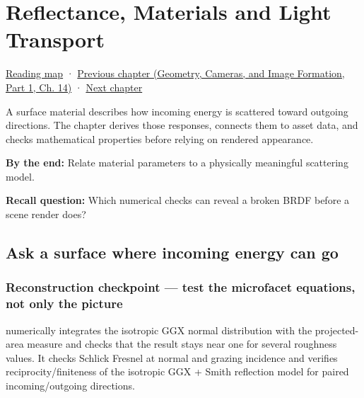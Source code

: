 \chapter{Reflectance, Materials and Light Transport}\label{03-visual-computing-i-ch005-reflectance-materials-and-light-transport}\hypertarget{03-visual-computing-i-ch005}{}\label{stagechapter:03-visual-computing-i-ch005}

\hypertarget{03-visual-computing-i-ch005-reflectance-materials-and-light-transport}{}

\hyperref[volume-reading-map]{Reading map} · \href{../03-Geometry-Cameras-and-Image-Formation-P01/main.pdf\#04-visual-computing-ii-ch033}{Previous chapter (Geometry, Cameras, and Image Formation, Part 1, Ch. 14)} · \hyperref[03-visual-computing-i-ch007]{Next chapter}

A surface material describes how incoming energy is scattered toward outgoing directions. The chapter derives those responses, connects them to asset data, and checks mathematical properties before relying on rendered appearance.

\textbf{By the end:} Relate material parameters to a physically meaningful scattering model.

\textbf{Recall question:} Which numerical checks can reveal a broken BRDF before a scene render does?

\section{Ask a surface where incoming energy can go}\label{03-visual-computing-i-ch005-ask-a-surface-where-incoming-energy-can-go}

\hypertarget{03-visual-computing-i-ch005-ask-a-surface-where-incoming-energy-can-go}{}

\subsection{Reconstruction checkpoint --- test the microfacet equations, not only the picture}\label{03-visual-computing-i-ch005-reconstruction-checkpoint-test-the-microfacet-equations-not-only-the-picture}

\hypertarget{03-visual-computing-i-ch005-reconstruction-checkpoint-test-the-microfacet-equations-not-only-the-picture}{}

 numerically integrates the isotropic GGX normal distribution with the projected-area measure and checks that the result stays near one for several roughness values. It checks Schlick Fresnel at normal and grazing incidence and verifies reciprocity/finiteness of the isotropic GGX + Smith reflection model for paired incoming/outgoing directions.

